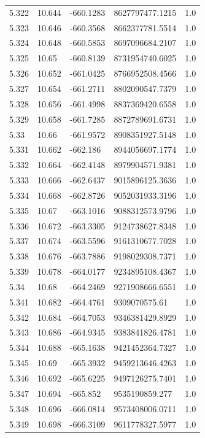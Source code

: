 \begin{tabular}{lllll}
5.322 & 10.644 & -660.1283 & 8627797477.1215 & 1.0 \\
5.323 & 10.646 & -660.3568 & 8662377781.5514 & 1.0 \\
5.324 & 10.648 & -660.5853 & 8697096684.2107 & 1.0 \\
5.325 & 10.65 & -660.8139 & 8731954740.6025 & 1.0 \\
5.326 & 10.652 & -661.0425 & 8766952508.4566 & 1.0 \\
5.327 & 10.654 & -661.2711 & 8802090547.7379 & 1.0 \\
5.328 & 10.656 & -661.4998 & 8837369420.6558 & 1.0 \\
5.329 & 10.658 & -661.7285 & 8872789691.6731 & 1.0 \\
5.33 & 10.66 & -661.9572 & 8908351927.5148 & 1.0 \\
5.331 & 10.662 & -662.186 & 8944056697.1774 & 1.0 \\
5.332 & 10.664 & -662.4148 & 8979904571.9381 & 1.0 \\
5.333 & 10.666 & -662.6437 & 9015896125.3636 & 1.0 \\
5.334 & 10.668 & -662.8726 & 9052031933.3196 & 1.0 \\
5.335 & 10.67 & -663.1016 & 9088312573.9796 & 1.0 \\
5.336 & 10.672 & -663.3305 & 9124738627.8348 & 1.0 \\
5.337 & 10.674 & -663.5596 & 9161310677.7028 & 1.0 \\
5.338 & 10.676 & -663.7886 & 9198029308.7371 & 1.0 \\
5.339 & 10.678 & -664.0177 & 9234895108.4367 & 1.0 \\
5.34 & 10.68 & -664.2469 & 9271908666.6551 & 1.0 \\
5.341 & 10.682 & -664.4761 & 9309070575.61 & 1.0 \\
5.342 & 10.684 & -664.7053 & 9346381429.8929 & 1.0 \\
5.343 & 10.686 & -664.9345 & 9383841826.4781 & 1.0 \\
5.344 & 10.688 & -665.1638 & 9421452364.7327 & 1.0 \\
5.345 & 10.69 & -665.3932 & 9459213646.4263 & 1.0 \\
5.346 & 10.692 & -665.6225 & 9497126275.7401 & 1.0 \\
5.347 & 10.694 & -665.852 & 9535190859.277 & 1.0 \\
5.348 & 10.696 & -666.0814 & 9573408006.0711 & 1.0 \\
5.349 & 10.698 & -666.3109 & 9611778327.5977 & 1.0 \\

\end{tabular}
